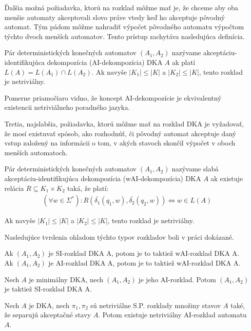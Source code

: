Ďalšia možná požiadavka, ktorú na rozklad môžme mať je, že chceme aby oba menšie automaty akceptovali slovo práve vtedy keď ho akceptuje pôvodný automat. Tým pádom môžme nahradiť výpočet pôvodného automatu výpočtom týchto dvoch menších automatov. Tento prístup zachytáva nasledujúca definícia.

\begin{definition}
Pár deterministických konečných automatov $ (A_1,A_2) $ nazývame akceptáciu-identifikujúca dekompozícia (AI-dekompozícia) DKA $ A $ ak platí $ L(A)=L(A_1) \cap L(A_2) $. Ak navyše $ |K_1| \leq |K| $ a $ |K_2| \leq |K| $, tento rozklad je netriviálny.
\end{definition}

Pomerne priamočiaro vidno, že koncept AI-dekompozície je ekvivalentný existencii netriviálneho poradného jazyka.
\par
Tretia, najslabšia, požiadavka, ktorú môžme mať na rozklad DKA je vyžadovať, že mosí existuvať spósob, ako rozhodnúť, či pôvodný automat akceptuje daný vstup založený na informácii o tom, v akých stavoch skončil výpočet v oboch menších automatoch.

\begin{definition}
Pár deterministických konečných automatov $ (A_1,A_2) $ nazývame slabá akceptáciu-identifikujúca dekompozícia (wAI-dekompozícia) DKA $ A $ ak existuje relácia $ R \subseteq K_1 \times K_2 $ taká, že platí: 
\begin{align*}
(\forall w \in \Sigma^*): R(\overline{\delta_1}(q_1,w),\overline{\delta_2}(q_2,w)) \Leftrightarrow w \in L(A)
\end{align*}

Ak navyše $ |K_1| \leq |K| $ a $ |K_2| \leq |K| $, tento rozklad je netriviálny.
\end{definition}

Nasledujúce tvrdenia ohladom týchto typov rozkladov boli v práci dokázané.

\begin{theorem}
Ak $ (A_1,A_2) $ je SI-rozklad DKA A, potom je to taktiež wAI-rozklad DKA A. Ak $ (A_1,A_2) $ je AI-rozklad DKA A, potom je to taktiež wAI-rozklad DKA A.
\end{theorem}

\begin{theorem}
Nech $ A $ je minimálny DKA, nech $ (A_1,A_2) $ je jeho AI-rozklad. Potom $ (A_1,A_2) $ je taktiež SI-rozklad DKA A.
\end{theorem}

\begin{theorem}
Nech $ A $ je DKA, nech $ \pi_1,\pi_2 $ sú netriviálne S.P. rozklady množiny stavov $ A $ také, že separujú akceptačné stavy $ A $. Potom existuje netriviálny AI-rozklad automatu $ A $.
\end{theorem}

